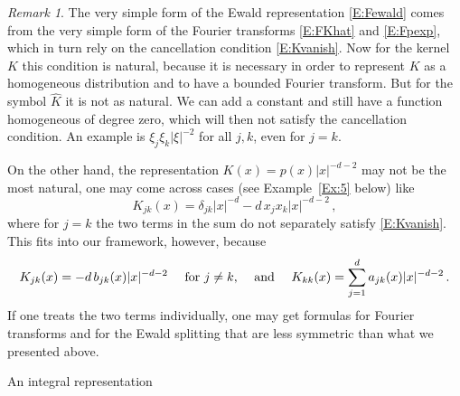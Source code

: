 \documentclass[12pt]{amsart}
\makeatletter
\def\subsection{\@startsection{section}{1}%
  \z@{1.2\linespacing\@plus\linespacing}{.5\linespacing}%
  {\normalfont\scshape\centering}}
\def\subsection{\@startsection{subsection}{2}%
  \z@{0.9\linespacing\@plus.7\linespacing}{-.5em}%
  {\normalfont\bfseries}}
\theoremstyle{definition}
\theoremstyle{remark}
\newtheorem{remark}[theorem]{Remark}
\numberwithin{equation}{section}
\let\hat=\widehat
\makeatother
\begin{document}
\begin{remark}
 \label{R:simple}
The very simple form of the Ewald representation \eqref{E:Fewald} comes from the very simple form of the Fourier transforms \eqref{E:FKhat} and \eqref{E:Fpexp}, which in turn rely on the cancellation condition \eqref{E:Kvanish}. Now for the kernel $K$ this condition is natural, because it is necessary in order to represent $K$ as a homogeneous distribution and to have a bounded Fourier transform. But for the symbol $\hat K$ it is not as natural. We can add a constant and still have a function homogeneous of degree zero, which will then not satisfy the cancellation condition. An example is $\xi_{j}\xi_{k}|\xi|^{-2}$ for all $j,k$, even for $j=k$.

On the other hand, the representation $K(x)=p(x)|x|^{-d-2}$ may not be the most natural, one may come across cases (see Example~\ref{Ex:5} below) like 
$$K_{jk}(x)=\delta_{jk}|x|^{-d}-d\,x_{j}x_{k}|x|^{-d-2}\,,
$$ 
where for $j=k$ the two terms in the sum do not separately satisfy \eqref{E:Kvanish}. This fits into our framework, however, because
$$
K_{jk}(x)=-d\,b_{jk}(x)|x|^{-d-2}\quad\mbox{ for $j\ne k$, \quad and }\quad
K_{kk}(x)=\sum_{j=1}^{d}a_{jk}(x)|x|^{-d-2}\,.
$$  
If one treats the two terms individually, one may get formulas for Fourier transforms and for the Ewald splitting that are less symmetric than what we presented above.
\end{remark}


\subsection{An integral representation}\label{SS:FInt}\ \nopagebreak
\end{document}
